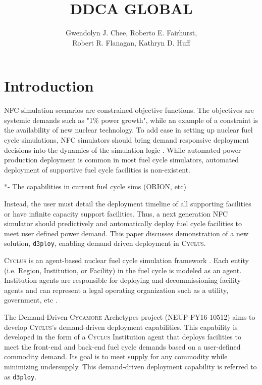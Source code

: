 \documentclass[11pt,letterpaper]{article}
\title{DDCA GLOBAL}
\author{Gwendolyn J. Chee, Roberto E. Fairhurst, 
\\ \vspace{0.5em} Robert R. Flanagan, Kathryn D. Huff}
\newcommand{\Cyclus}{\textsc{Cyclus}\xspace}%
\newcommand{\Cycamore}{\textsc{Cycamore}\xspace}%
\newcommand{\deploy}{\texttt{d3ploy}\xspace}%
\begin{document}
	\begin{titlepage}
	\maketitle
	\thispagestyle{empty}
	\end{titlepage}

\section{Introduction}
\gls{NFC} simulation scenarios are constrained objective functions. 
The objectives are systemic demands such as "1\% power growth", 
while an example of a constraint is the availability of new nuclear 
technology. 
To add ease in setting up nuclear fuel cycle simulations, \gls{NFC}
simulators should bring demand responsive deployment decisions into 
the dynamics of the simulation logic \cite{huff_current_2017}. 
While automated power production deployment is common in most fuel 
cycle simulators, automated deployment of supportive fuel cycle 
facilities is non-existent. 

*- The capabilities in current fuel cycle sims (ORION, etc)

Instead, the user must detail the deployment timeline of all 
supporting facilities or have infinite capacity support facilities. 
Thus, a next generation \gls{NFC} simulator should predictively and 
automatically deploy fuel cycle facilities to meet user defined 
power demand. 
This paper discusses demonstration of a new solution, 
\texttt{d3ploy}, enabling demand driven deployment in \Cyclus. 

\Cyclus is an agent-based nuclear fuel cycle simulation framework 
\cite{huff_fundamental_2016}. 
Each entity (i.e. Region, Institution, or Facility) in the fuel 
cycle is modeled as an agent. 
Institution agents
are responsible for deploying and decommissioning facility agents 
and can represent a legal operating organization such as a 
utility, government, etc \cite{huff_fundamental_2016}. 

The Demand-Driven \Cycamore Archetypes project (NEUP-FY16-10512) 
aims to develop \Cyclus's demand-driven deployment capabilities. 
This capability is developed in the form of a \Cyclus Institution
agent that deploys facilities to meet the front-end and back-end 
fuel cycle demands based on a user-defined commodity demand. 
Its goal is to meet supply for any commodity while minimizing 
undersupply.
This demand-driven deployment capability is referred to as 
\deploy. 
\end{document}
